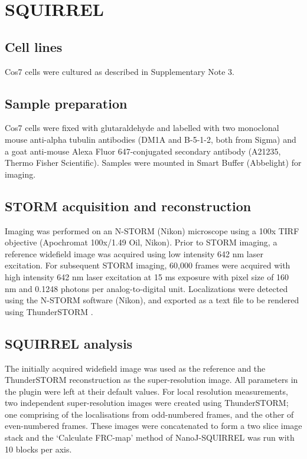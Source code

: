 \section{SQUIRREL}

\subsection{Cell lines}
Cos7 cells were cultured as described in Supplementary Note 3.

\subsection{Sample preparation}

Cos7 cells were fixed with glutaraldehyde and labelled with two monoclonal mouse anti-alpha tubulin antibodies (DM1A and B-5-1-2, both from Sigma) and a goat anti-mouse Alexa Fluor 647-conjugated secondary antibody (A21235, Thermo Fisher Scientific). Samples were mounted in Smart Buffer (Abbelight) for imaging.

\subsection{STORM acquisition and reconstruction}

Imaging was performed on an N-STORM (Nikon) microscope using a 100x TIRF objective (Apochromat 100x/1.49 Oil, Nikon). Prior to STORM imaging, a reference widefield image was acquired using low intensity 642 nm laser excitation. For subsequent STORM imaging, 60,000 frames were acquired with high intensity 642 nm laser excitation at 15 ms exposure with pixel size of 160 nm and 0.1248 photons per analog-to-digital unit. Localizations were detected using the N-STORM software (Nikon), and exported as a text file to be rendered using ThunderSTORM \cite{ovesny2014thunderstorm}.

\subsection{SQUIRREL analysis}

The initially acquired widefield image was used as the reference and the ThunderSTORM reconstruction as the super-resolution image. All parameters in the plugin were left at their default values. For local resolution measurements, two independent super-resolution images were created using ThunderSTORM; one comprising of the localisations from odd-numbered frames, and the other of even-numbered frames. These images were concatenated to form a two slice image stack and the ‘Calculate FRC-map’ method of NanoJ-SQUIRREL was run with 10 blocks per axis.

